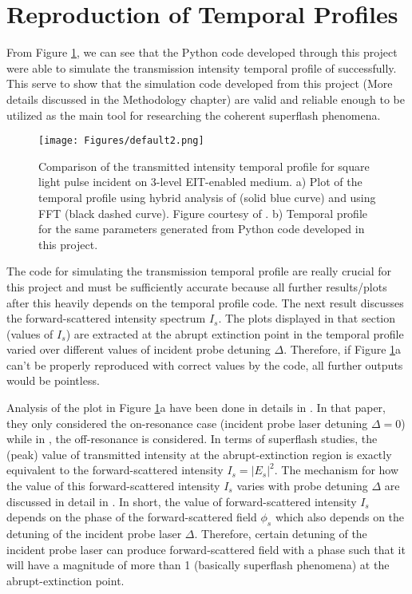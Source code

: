 \section{Reproduction of Temporal Profiles}
From Figure \ref{fig: comparing temporal profile 1}, we can see that the Python code developed through this project were able to simulate the transmission intensity temporal profile of \cite{jeong2010slow} successfully. This serve to show that the simulation code developed from this project (More details discussed in the Methodology chapter) are valid and reliable enough to be utilized as the main tool for researching the coherent superflash phenomena.

\begin{figure}[h!]
    \centering
    \texttt{[image: Figures/default2.png]}
    \caption{Comparison of the transmitted intensity temporal profile for square light pulse incident on 3-level EIT-enabled medium. a) Plot of the temporal profile using hybrid analysis of \protect\cite{jeong2010slow} (solid blue curve) and using FFT (black dashed curve). Figure courtesy of \protect\cite{jeong2010slow}. b) Temporal profile for the same parameters generated from Python code developed in this project.}
    \label{fig: comparing temporal profile 1}
\end{figure}

The code for simulating the transmission temporal profile are really crucial for this project and must be sufficiently accurate because all further results/plots after this heavily depends on the temporal profile code. The next result discusses the forward-scattered intensity spectrum $I_{s}$. The plots displayed in that section (values of $I_{s}$) are extracted at the abrupt extinction point in the temporal profile varied over different values of incident probe detuning $\Delta$. Therefore, if Figure \ref{fig: comparing temporal profile 1}a can't be properly reproduced with correct values by the code, all further outputs would be pointless.

Analysis of the plot in Figure \ref{fig: comparing temporal profile 1}a have been done in details in \cite{jeong2010slow}. In that paper, they only considered the on-resonance case (incident probe laser detuning $\Delta = 0$) while in \cite{Kwong2014}, the off-resonance is considered. In terms of superflash studies, the (peak) value of transmitted intensity at the abrupt-extinction region is exactly equivalent to the forward-scattered intensity $I_{s} = |E_{s}|^{2}$. The mechanism for how the value of this forward-scattered intensity $I_{s}$ varies with probe detuning $\Delta$ are discussed in detail in \cite{Chalony2011, Kwong2014, Kwong2017}. In short, the value of forward-scattered intensity $I_{s}$ depends on the phase of the forward-scattered field $\phi_{s}$ which also depends on the detuning of the incident probe laser $\Delta$. Therefore, certain detuning of the incident probe laser can produce forward-scattered field with a phase such that it will have a magnitude of more than 1 (basically superflash phenomena) at the abrupt-extinction point.

